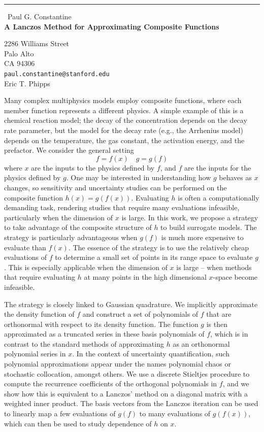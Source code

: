 \documentclass{report}
\begin{document}
\begin{center}
\rule{6in}{1pt} \
{\large Paul G. Constantine \\
{\bf A Lanczos Method for Approximating Composite Functions}}

2286 Williams Street \\ Palo Alto \\ CA 94306
\\
{\tt paul.constantine@stanford.edu}\\
Eric T. Phipps\end{center}

Many complex multiphysics models employ composite functions, where each
member function represents a different physics. A simple example of this
is a chemical reaction model; the decay of the concentration depends on
the decay rate parameter, but the model for the decay rate (e.g., the
Arrhenius model) depends on the temperature, the gas constant, the
activation energy, and the prefactor. We consider the general setting
\[
f = f(x) \quad g = g(f)
\]
where $x$ are the inputs to the physics defined by $f$, and $f$ are the
inputs for the physics defined by $g$. One may be interested in
understanding how $g$ behaves as $x$ changes, so sensitivity and
uncertainty studies can be performed on the composite function $h(x) =
g(f(x))$. Evaluating $h$ is often a computationally demanding task,
rendering studies that require many evaluations infeasible, particularly
when the dimension of $x$ is large. In this work, we propose a strategy
to take advantage of the composite structure of $h$ to build surrogate
models. The strategy is particularly advantageous when $g(f)$ is much
more expensive to evaluate than $f(x)$. The essence of the strategy is to
use the relatively cheap evaluations of $f$ to determine a small set of
points in its range space to evaluate $g$. This is especially applicable
when the dimension of $x$ is large -- when methods that require
evaluating $h$ at many points in the high dimensional $x$-space become
infeasible.

The strategy is closely linked to Gaussian quadrature. We implicitly
approximate the density function of $f$ and construct a set of
polynomials of $f$ that are orthonormal with respect to its density
function. The function $g$ is then approximated as a truncated series in
these basis polynomials of $f$, which is in contrast to the standard
methods of approximating $h$ as an orthonormal polynomial series in $x$.
In the context of uncertainty quantification, such polynomial
approximations appear under the names polynomial chaos or stochastic
collocation, amongst others. We use a discrete Stieltjes procedure to
compute the recurrence coefficients of the orthogonal polynomials in $f$,
and we show how this is equivalent to a Lanczos' method on a diagonal
matrix with a weighted inner product. The basis vectors from the Lanczos
iteration can be used to linearly map a few evaluations of $g(f)$ to many
evaluations of $g(f(x))$, which can then be used to study dependence of
$h$ on $x$.
\end{document}
